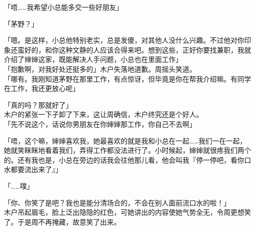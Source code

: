 「唔……我希望小总能多交一些好朋友」

「茅野？」

「嗯。是这样，小总他特别老实，总是发傻，对其他人没什么兴趣。不过他对你印象还蛮好的，和你这种文静的人应该合得来吧。想到这些，正好你要找兼职，我就介绍了婶婶这家，既能解决人手问题，小总也在里面工作」\\

「抱歉啊，对我好处还挺多的」木户失落地道歉。周摇头笑道。\\

「哪有。我刚知道茅野在那里工作，有点惊讶，但毕竟是你在帮我介绍嘛。有同学在工作，我还更放心呢」

「真的吗？那就好了」\\

木户的紧张一下子卸了下来，这让周确信，木户终究还是个好人。\\

「先不说这个，话说你男朋友在你婶婶那工作，你自己不去啊」

「唔，这个嘛，婶婶喜欢我，她最喜欢的就是我和小总在一起……我们一在一起，她就笑眯眯地看着我们，弄得工作都没法进行了。小时候起，婶婶就很疼我们两个的。还有我也是，小总在旁边的话我会往他那儿看，他会叫我『停一停吧，看你口水都要流出来了』」

「……噗」

「你、你笑了是吧？我也是能分清场合的，不会在别人面前流口水的啦！」\\

木户吊起眉毛，脸上泛出隐隐的红色，可她讲出的内容使她气势全无，令周更想笑了。于是周不再掩藏，故意笑了出来。
